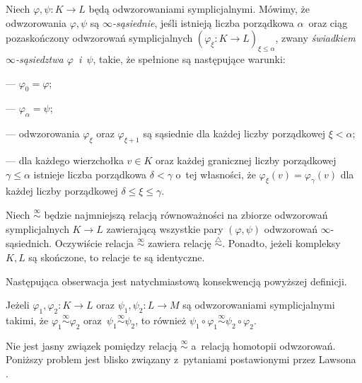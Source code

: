 Niech $\varphi,\psi\colon K\to L$ będą odwzorowaniami symplicjalnymi. Mówimy, że odwzorowania $\varphi,\psi$ są \textit{$\infty$-sąsiednie}, jeśli istnieją liczba porządkowa $\alpha$~oraz ciąg pozaskończony odwzorowań symplicjalnych $\left(\varphi_\xi\colon K\to L\right)_{\xi\leq\alpha}$, zwany \textit{świadkiem \mbox{$\infty$-sąsiedztwa} $\varphi$~i~$\psi$}, takie, że spełnione są następujące warunki:
\begin{compactitem}
\item[---] $\varphi_0=\varphi$;
\item[---] $\varphi_\alpha=\psi$;
\item[---] odwzorowania $\varphi_{\xi}$ oraz $\varphi_{\xi+1}$ są sąsiednie dla każdej liczby porządkowej $\xi<\alpha$;
\item[---] dla każdego wierzchołka $v\in K$ oraz każdej granicznej liczby porządkowej $\gamma\leq \alpha$ istnieje liczba porządkowa $\delta<\gamma$ o~tej własności, że $\varphi_{\xi}(v)=\varphi_{\gamma}(v)$ dla każdej liczby porządkowej $\delta\leq \xi\leq \gamma$.
\end{compactitem}
Niech $\stackrel{\infty}{\sim}$ będzie najmniejszą relacją równoważności na zbiorze odwzorowań symplicjalnych $K\to L$ zawierającą wszystkie pary $(\varphi,\psi)$ odwzorowań $\infty$-sąsiednich. Oczywiście relacja $\stackrel{\infty}{\sim}$ zawiera relację $\stackrel{\triangle}{\sim}$. Ponadto, jeżeli kompleksy $K,L$ są skończone, to relacje te są identyczne. 

Następująca obserwacja jest natychmiastową konsekwencją powyższej definicji.
\begin{lem}\label{lem-stackrel_zgodny_ze_zlozeniami}
Jeżeli $\varphi_1,\varphi_2\colon K\to L$ oraz $\psi_1,\psi_2\colon L\to M$ są odwzorowaniami symplicjalnymi takimi, że $\varphi_1\stackrel{\infty}{\sim}\varphi_2$ oraz~$\psi_1\stackrel{\infty}{\sim}\psi_2$, to również $\psi_1\circ \varphi_1\stackrel{\infty}{\sim}\psi_2\circ \varphi_2$.
\end{lem}

Nie jest jasny związek pomiędzy relacją $\stackrel{\infty}{\sim}$ a~relacją homotopii odwzorowań. Poniższy problem jest blisko związany z~pytaniami postawionymi przez Lawsona \cite[p.~837]{Rival82}.

